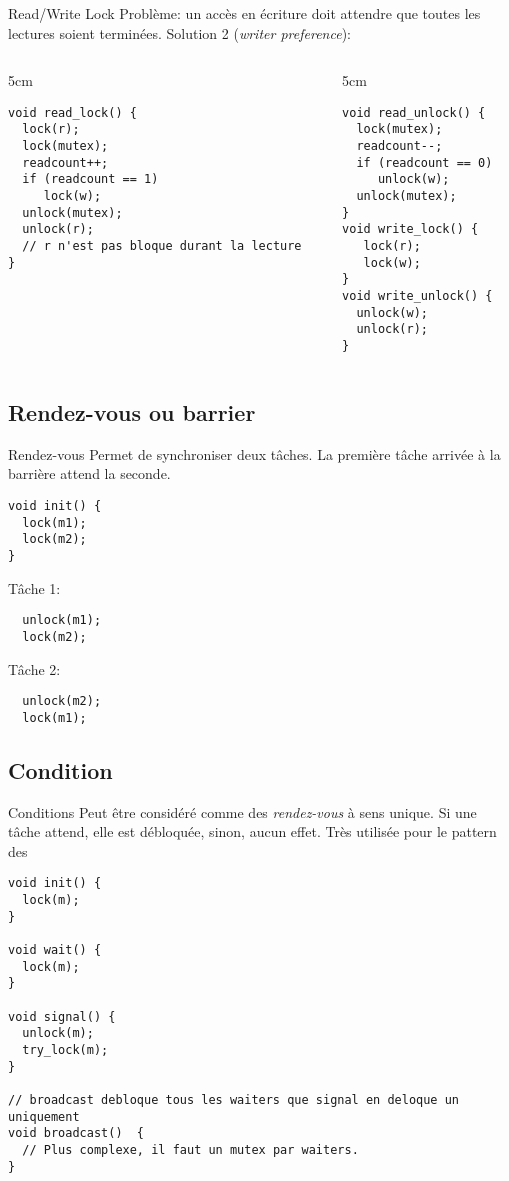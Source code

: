 \begin{frame}[fragile]{Read/Write Lock}
  Problème: un accès en écriture doit attendre que toutes les lectures
  soient terminées. Solution 2 (\emph{writer preference}):
  \begin{columns}
    \begin{column} {5cm}
      \begin{lstlisting} 
void read_lock() {
  lock(r);
  lock(mutex);
  readcount++;
  if (readcount == 1)
     lock(w);
  unlock(mutex);
  unlock(r);
  // r n'est pas bloque durant la lecture
}
       \end{lstlisting} 
     \end{column}
     \begin{column} {5cm}
       \begin{lstlisting} 
void read_unlock() {
  lock(mutex);
  readcount--;
  if (readcount == 0)
     unlock(w);
  unlock(mutex);
}
void write_lock() {
   lock(r);
   lock(w);
}
void write_unlock() {
  unlock(w);
  unlock(r);
}
      \end{lstlisting} 
    \end{column}
  \end{columns}
\end{frame} 

\subsection{Rendez-vous ou barrier}
\begin{frame}[fragile]{Rendez-vous}
Permet de synchroniser deux tâches. La première tâche arrivée à la barrière attend la seconde.
\begin{lstlisting} 
void init() {
  lock(m1);
  lock(m2);
}
\end{lstlisting}
Tâche 1:
\begin{lstlisting} 
  unlock(m1);
  lock(m2);
\end{lstlisting} 
Tâche 2:
\begin{lstlisting} 
  unlock(m2);
  lock(m1);
\end{lstlisting} 
\end{frame}

\subsection{Condition}

\begin{frame}[fragile]{Conditions}
Peut être considéré comme des \emph{rendez-vous} à sens unique. Si une tâche attend, elle est débloquée, sinon, aucun effet. Très utilisée pour le pattern des 
\begin{lstlisting} 
void init() {
  lock(m);
}

void wait() {
  lock(m);
}

void signal() {
  unlock(m);
  try_lock(m);
}

// broadcast debloque tous les waiters que signal en deloque un uniquement
void broadcast()  {
  // Plus complexe, il faut un mutex par waiters. 
}
\end{lstlisting} 
\end{frame} 


